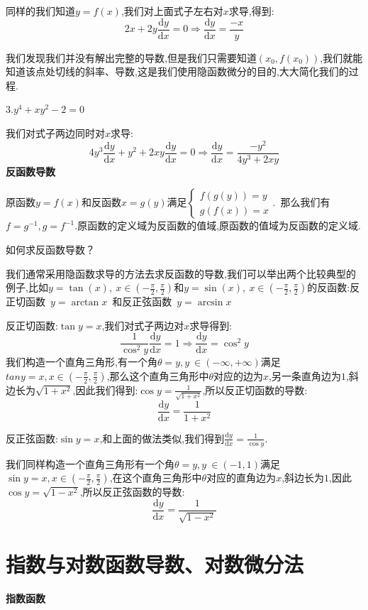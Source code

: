 \documentclass[oneside]{book}
\begin{document}
	同样的我们知道$y=f(x)$,我们对上面式子左右对$x$求导,得到:
	$$2x+2y\frac{\mathrm{d}y}{\mathrm{d}x}=0\Rightarrow \frac{\mathrm{d}y}{\mathrm{d}x}=\frac{-x}{y}$$
	
	我们发现我们并没有解出完整的导数,但是我们只需要知道$(x_{0},f(x_{0}))$,我们就能知道该点处切线的斜率、导数,这是我们使用隐函数微分的目的,大大简化我们的过程.
	
	3.$y^{4}+xy^{2}-2=0$
	
	我们对式子两边同时对$x$求导:$$4y^{3}\frac{\mathrm{d}y}{\mathrm{d}x}+y^{2}+2xy\frac{\mathrm{d}y}{\mathrm{d}x}=0\Rightarrow \frac{\mathrm{d}y}{\mathrm{d}x}=\frac{-y^{2}}{4y^{3}+2xy}$$
	\textbf{反函数导数}
	
	原函数$y=f(x)$和反函数$x=g(y)$满足$\left\{\begin{array}{c}
		f(g(y))=y\\g(f(x))=x
	\end{array}\right.$.\ 那么我们有$f=g^{-1},g=f^{-1}$.原函数的定义域为反函数的值域,原函数的值域为反函数的定义域.

	如何求反函数导数？
	
	我们通常采用隐函数求导的方法去求反函数的导数,我们可以举出两个比较典型的例子,比如$y=\tan(x),\ x\in (-\frac{\pi}{2},\frac{\pi}{2})$和$y=\sin(x),\ x\in (-\frac{\pi}{2},\frac{\pi}{2})$的反函数:反正切函数\ $y=\arctan x$\ 和反正弦函数\ $y=\arcsin x$
	
	反正切函数:$\tan y=x$,我们对式子两边对$x$求导得到:
	$$\frac{1}{\cos^{2}y}\frac{\mathrm{d}y}{\mathrm{d}x}=1\Rightarrow \frac{\mathrm{d}y}{\mathrm{d}x}=\cos^{2}y$$
	我们构造一个直角三角形,有一个角$\theta=y,y\ \in (-\infty,+\infty)$满足$tan y=x,x \in (-\frac{\pi}{2},\frac{\pi}{2})$,那么这个直角三角形中$\theta$对应的边为$x$,另一条直角边为$1$,斜边长为$\sqrt{1+x^{2}}$,因此我们得到:$\cos y=\frac{1}{\sqrt{1+x^{2}}}$,所以反正切函数的导数:$$\frac{\mathrm{d}y}{\mathrm{d}x}=\frac{1}{1+x^{2}}$$
	
	反正弦函数:$\sin y=x$,和上面的做法类似,我们得到$\frac{\mathrm{d}y}{\mathrm{d}x}=\frac{1}{\cos y}$.
	
	我们同样构造一个直角三角形有一个角$\theta=y,y\ \in (-1,1)$满足$\sin y=x,x\in (-\frac{\pi}{2},\frac{\pi}{2})$,在这个直角三角形中$\theta$对应的直角边为$x$,斜边长为$1$,因此$\cos y=\sqrt{1-x^{2}}$,所以反正弦函数的导数:$$\frac{\mathrm{d}y}{\mathrm{d}x}=\frac{1}{\sqrt{1-x^{2}}}$$
	\chapter{指数与对数函数导数、对数微分法}
	\centerline{\textbf{指数函数}}
	
\end{document}
